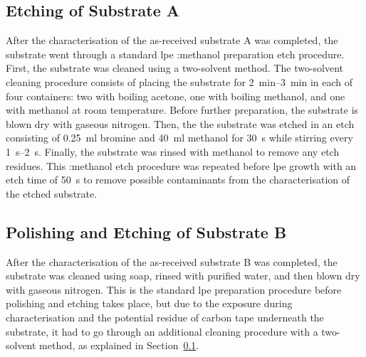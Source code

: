 \subsection{Etching of Substrate A}\label{sec:subA_etch}

After the characterisation of the as-received substrate A was completed, the substrate went through a standard \ac{lpe} :methanol preparation etch procedure. First, the substrate was cleaned using a two-solvent method. The two-solvent cleaning procedure consists of placing the substrate for \SIrange{2}{3}{\minute} in each of four containers: two with boiling acetone, one with boiling methanol, and one with methanol at room temperature. Before further preparation, the substrate is blown dry with gaseous nitrogen. Then, the the substrate was etched in an etch consisting of \SI{0.25}{\milli\litre} bromine and \SI{40}{\milli\litre} methanol for \SI{30}{\second} while stirring every \SIrange{1}{2}{\second}. Finally, the substrate was rinsed with methanol to remove any etch residues. This :methanol etch procedure was repeated before \ac{lpe} growth with an etch time of \SI{50}{\second} to remove possible contaminants from the characterisation of the etched substrate. %

\subsection{Polishing and Etching of Substrate B}

After the characterisation of the as-received substrate B was completed, the substrate was cleaned using soap, rinsed with purified water, and then blown dry with gaseous nitrogen. This is the standard \ac{lpe} preparation procedure before polishing and etching takes place, but due to the exposure during characterisation and the potential residue of carbon tape underneath the substrate, it had to go through an additional cleaning procedure with a two-solvent method, as explained in Section~\ref{sec:subA_etch}.%

